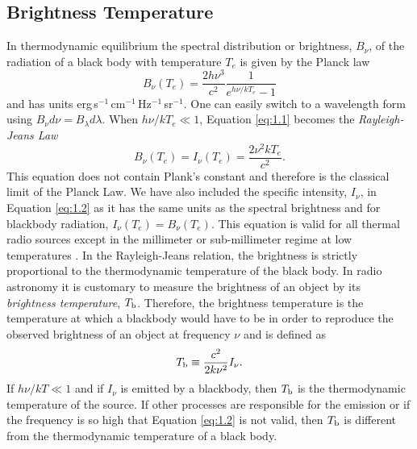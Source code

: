 \subsection{Brightness Temperature}\label{sec:1.8.1}
In thermodynamic equilibrium the spectral distribution or brightness, $B_{\nu}$, of the radiation of a black body with temperature $T_{e}$ is given by the Planck law
\begin{equation}\label{eq:1.1}
B_{\nu}(T_{e})=\frac{2h\nu ^3}{c^2}\frac{1}{e^{h\nu /kT_{e}}-1}
\end{equation}
and has units erg\,s$^{-1}$\,cm$^{-1}$\,Hz$^{-1}$\,sr$^{-1}$. One can easily switch to a wavelength form using  $B_{\nu}d\nu = B_{\lambda}d\lambda$. When $h\nu /kT_{e} \ll 1$, Equation \ref{eq:1.1} becomes the \textit{Rayleigh-Jeans Law}
\begin{equation}
\label{eq:1.2}
B_{\nu}(T_{e})=I_{\nu}(T_{e})=\dfrac{2\nu ^2kT_{e}}{c^2}.
\end{equation}
This equation does not contain Plank's constant and therefore is the classical limit of the Planck Law. We have also included the specific intensity, $I_{\nu}$, in Equation \ref{eq:1.2} as it has the same units as the spectral brightness and for blackbody radiation, $I_{\nu}(T_{e}) = B_{\nu}(T_{e})$. This equation is valid for all thermal radio sources except in the millimeter or sub-millimeter regime at low temperatures \citep{rohlfs_1996}. In the Rayleigh-Jeans relation, the brightness is strictly proportional to the thermodynamic temperature of the black body. In radio astronomy it is customary to measure the brightness of an object by its \textit{brightness temperature}, $T_{\rm{b}}$. Therefore, the brightness temperature is the temperature at which a blackbody would have to be in order to reproduce the observed brightness of an object at frequency $\nu$ and is defined as
\begin{equation}\label{eq:1.3}
T_{\rm{b}}\equiv \frac{c^2}{2k\nu ^2}I_{\nu}. 
\end{equation}
If $h\nu /kT \ll 1$ and if $I_{\nu}$ is emitted by a blackbody, then $T_{\rm{b}}$ is the thermodynamic temperature of the source. If other processes are responsible for the emission or if the frequency is so high that Equation \ref{eq:1.2} is not valid, then $T_{\rm{b}}$ is different from the thermodynamic temperature of a black body.

